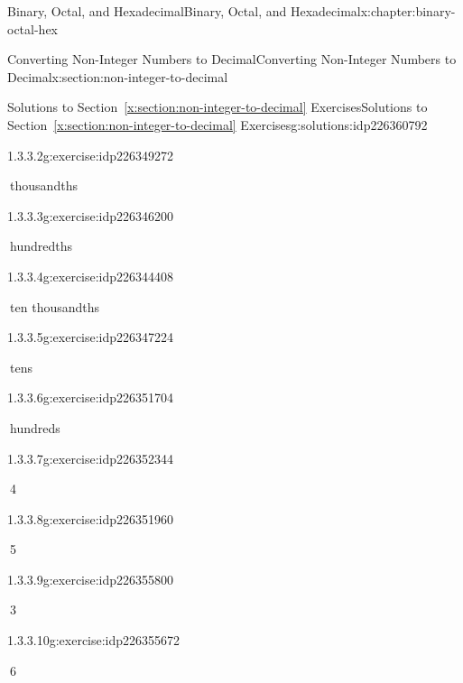 \documentclass[twoside,10pt,]{book}
\newcommand{\xreffont}{\relax}
\numberwithin{equation}{section}
\begin{document}
\begin{chapterptx}{Binary, Octal, and Hexadecimal}{}{Binary, Octal, and Hexadecimal}{}{}{x:chapter:binary-octal-hex}
\begin{sectionptx}{Converting Non-Integer Numbers to Decimal}{}{Converting Non-Integer Numbers to Decimal}{}{}{x:section:non-integer-to-decimal}
\begin{solutions-subsection}{Solutions to Section~{\xreffont\ref*{x:section:non-integer-to-decimal}} Exercises}{}{Solutions to Section~{\xreffont\ref*{x:section:non-integer-to-decimal}} Exercises}{}{}{g:solutions:idp226360792}
\begin{exercisegroup}
\begin{divisionsolutioneg}{1.3.3.2}{}{g:exercise:idp226349272}
\par\smallskip%
\noindent\hypertarget{g:solution:idp226344024-main}{}\(\ \)thousandths\end{divisionsolutioneg}%
\begin{divisionsolutioneg}{1.3.3.3}{}{g:exercise:idp226346200}%
\par\smallskip%
\noindent\hypertarget{g:solution:idp226345304-main}{}\(\ \)hundredths\end{divisionsolutioneg}%
\begin{divisionsolutioneg}{1.3.3.4}{}{g:exercise:idp226344408}%
\par\smallskip%
\noindent\hypertarget{g:solution:idp226348248-main}{}\(\ \)ten thousandths\end{divisionsolutioneg}%
\begin{divisionsolutioneg}{1.3.3.5}{}{g:exercise:idp226347224}%
\par\smallskip%
\noindent\hypertarget{g:solution:idp226347480-main}{}\(\ \)tens\end{divisionsolutioneg}%
\begin{divisionsolutioneg}{1.3.3.6}{}{g:exercise:idp226351704}%
\par\smallskip%
\noindent\hypertarget{g:solution:idp226354008-main}{}\(\ \)hundreds\end{divisionsolutioneg}%
\end{exercisegroup}
\par\medskip\noindent
\begin{exercisegroup}
\begin{divisionsolutioneg}{1.3.3.7}{}{g:exercise:idp226352344}%
\par\smallskip%
\noindent\hypertarget{g:solution:idp226352216-main}{}\(\ \)4\end{divisionsolutioneg}%
\begin{divisionsolutioneg}{1.3.3.8}{}{g:exercise:idp226351960}%
\par\smallskip%
\noindent\hypertarget{g:solution:idp226358744-main}{}\(\ \)5\end{divisionsolutioneg}%
\begin{divisionsolutioneg}{1.3.3.9}{}{g:exercise:idp226355800}%
\par\smallskip%
\noindent\hypertarget{g:solution:idp226355032-main}{}\(\ \)3\end{divisionsolutioneg}%
\begin{divisionsolutioneg}{1.3.3.10}{}{g:exercise:idp226355672}%
\par\smallskip%
\noindent\hypertarget{g:solution:idp226355928-main}{}\(\ \)6\end{divisionsolutioneg}%

\end{exercisegroup}
\end{solutions-subsection}
\end{sectionptx}
\end{chapterptx}
\end{document}
